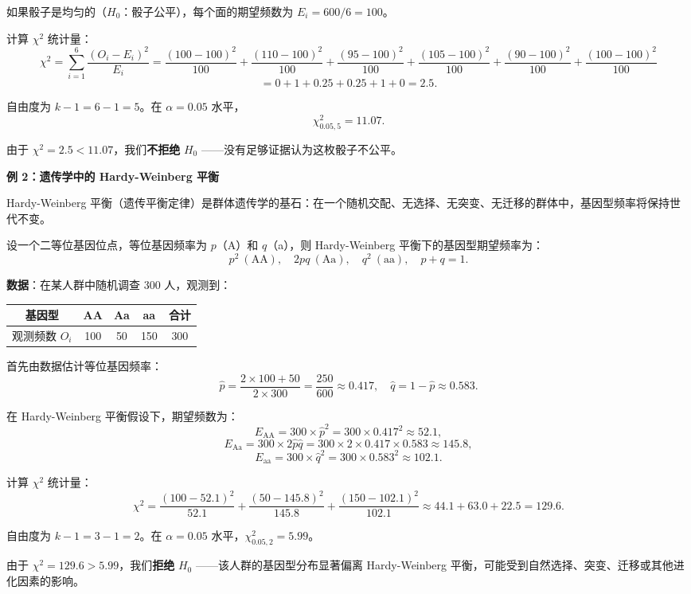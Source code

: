 如果骰子是均匀的（$H_0$：骰子公平），每个面的期望频数为 $E_i = 600/6 = 100$。

计算 $\chi^2$ 统计量：
\[
\chi^2 = \sum_{i=1}^6 \frac{(O_i - E_i)^2}{E_i}
= \frac{(100-100)^2}{100} + \frac{(110-100)^2}{100} + \frac{(95-100)^2}{100}
+ \frac{(105-100)^2}{100} + \frac{(90-100)^2}{100} + \frac{(100-100)^2}{100}
\]
\[
= 0 + 1 + 0.25 + 0.25 + 1 + 0 = 2.5.
\]

自由度为 $k-1 = 6-1 = 5$。在 $\alpha = 0.05$ 水平，
\[
\chi^2_{0.05, 5} = 11.07.
\]

由于 $\chi^2 = 2.5 < 11.07$，我们\textbf{不拒绝} $H_0$ ——没有足够证据认为这枚骰子不公平。

\textbf{例 2：遗传学中的 Hardy-Weinberg 平衡}

Hardy-Weinberg 平衡（遗传平衡定律）是群体遗传学的基石：在一个随机交配、无选择、无突变、无迁移的群体中，基因型频率将保持世代不变。

设一个二等位基因位点，等位基因频率为 $p$（A）和 $q$（a），则 Hardy-Weinberg 平衡下的基因型期望频率为：
\[
p^2\ (\text{AA}), \quad 2pq\ (\text{Aa}), \quad q^2\ (\text{aa}), \quad p+q=1.
\]

\noindent\textbf{数据}：在某人群中随机调查 300 人，观测到：
\begin{center}
\begin{tabular}{c|ccc|c}
\hline
基因型 & AA & Aa & aa & 合计 \\ \hline
观测频数 $O_i$ & 100 & 50 & 150 & 300 \\
\hline
\end{tabular}
\end{center}

首先由数据估计等位基因频率：
\[
\widehat{p} = \frac{2 \times 100 + 50}{2 \times 300} = \frac{250}{600} \approx 0.417, \quad
\widehat{q} = 1 - \widehat{p} \approx 0.583.
\]

在 Hardy-Weinberg 平衡假设下，期望频数为：
\[
E_{\text{AA}} = 300 \times \widehat{p}^2 = 300 \times 0.417^2 \approx 52.1,
\]
\[
E_{\text{Aa}} = 300 \times 2\widehat{p}\widehat{q} = 300 \times 2 \times 0.417 \times 0.583 \approx 145.8,
\]
\[
E_{\text{aa}} = 300 \times \widehat{q}^2 = 300 \times 0.583^2 \approx 102.1.
\]

计算 $\chi^2$ 统计量：
\[
\chi^2 = \frac{(100-52.1)^2}{52.1} + \frac{(50-145.8)^2}{145.8} + \frac{(150-102.1)^2}{102.1}
\approx 44.1 + 63.0 + 22.5 = 129.6.
\]

自由度为 $k-1 = 3-1 = 2$。在 $\alpha = 0.05$ 水平，$\chi^2_{0.05, 2} = 5.99$。

由于 $\chi^2 = 129.6 > 5.99$，我们\textbf{拒绝} $H_0$ ——该人群的基因型分布显著偏离 Hardy-Weinberg 平衡，可能受到自然选择、突变、迁移或其他进化因素的影响。

